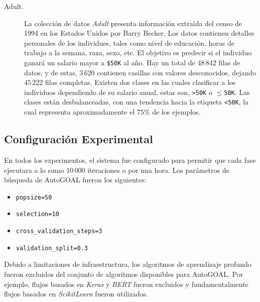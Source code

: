\begin{description}
\item[Adult.]
La colección de datos \emph{Adult} \parencite{ucidata} presenta información extraída del censo de 1994 en los Estados Unidos por Barry Becker.
Los datos contienen detalles personales de los individues, tales como nivel de educación, horas de trabajo a la semana, raza, sexo, etc.
El objetivo es predecir si el individuo ganará un salario mayor a \texttt{\$50K} al año.
Hay un total de $48\,842$ filas de datos, y de estas, $3\,620$ contienen casillas con valores desconocidos, dejando $45\,222$ filas completas.
Existen dos clases en las cuales clasificar a los individuos dependiendo de su salario anual, estas son, \texttt{>50K} o \texttt{$\leq$50K}.
Las clases están desbalanceadas, con una tendencia hacia la etiqueta \texttt{<50K}, la cual representa aproximadamente el $75\%$ de los ejemplos.

\end{description}

\subsection{Configuración Experimental}\label{section:experimental-setup}

En todos los experimentos, el sistema fue configurado para permitir que cada fase ejecutara a lo sumo $10\,000$ iteraciones o por una hora.
Los parámetros de búsqueda de AutoGOAL fueron los siguientes:
\begin{itemize}
    \item \texttt{popsize=50}
    \item \texttt{selection=10}
    \item \texttt{cross\_validation\_steps=3}
    \item \texttt{validation\_split=0.3}
\end{itemize}

Debido a limitaciones de infraestructura, los algoritmos de aprendizaje profundo fueron excluidos del conjunto de algoritmos disponibles para AutoGOAL.
Por ejemplo, flujos basados en \emph{Keras} y \emph{BERT} fueron excluidos y fundamentalmente flujos basados en \emph{ScikitLearn} fueron utilizados.

